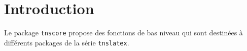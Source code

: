 \documentclass[12pt,a4paper]{article}
\begin{document}
\section{Introduction}

Le package \verb#tnscore# propose des fonctions de bas niveau qui sont destinées à différents packages de la série \verb#tnslatex#.
\end{document}
